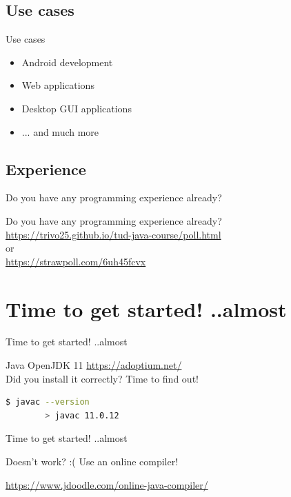 \subsection{Use cases}
\begin{frame}{Use cases}
	\begin{itemize}
		\item Android development
		\item Web applications
		\item Desktop GUI applications
		\item ... and much more
	\end{itemize}
\end{frame}


\subsection{Experience}
\begin{frame}{Do you have any programming experience already?}
	\begin{center}
		Do you have any programming experience already?\\
		\url{https://trivo25.github.io/tud-java-course/poll.html}\\
		or\\
		\url{https://strawpoll.com/6uh45fcvx}
	\end{center}
\end{frame}



\section{Time to get started! ..almost}

\begin{frame}[fragile]{Time to get started! ..almost}
	\begin{center}
		Java OpenJDK 11 \url{https://adoptium.net/}
		\\
		Did you install it correctly? Time to find out!
	\end{center}

	\begin{lstlisting}[language=bash]
		$ javac --version
		> javac 11.0.12
	\end{lstlisting}
\end{frame}



\begin{frame}[fragile]{Time to get started! ..almost}
	\begin{center}
		Doesn't work? :(
		Use an online compiler!

		\url{https://www.jdoodle.com/online-java-compiler/}
	\end{center}
\end{frame}




